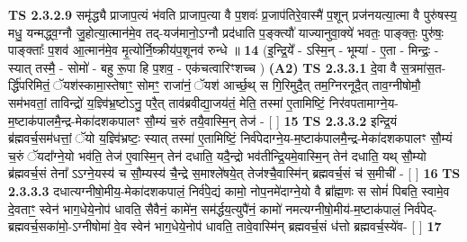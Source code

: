 \documentclass[17pt]{extarticle}
\begin{document}
                  \newline
                                \textbf{ TS 2.3.2.9} \newline
                  समृ॑द्ध्यै प्राजाप॒त्यं भ॑वति प्राजाप॒त्या वै प॒शवः॑ प्र॒जाप॑तिरे॒वास्मै॑ प॒शून् प्रज॑नयत्या॒त्मा वै पुरु॑षस्य॒ मधु॒ यन्मद्ध्व॒ग्नौ जु॒होत्या॒त्मान॑मे॒व तद्-यज॑मानो॒ऽग्नौ प्रद॑धाति प॒ङ्क्त्यौ॑ याज्यानुवा॒क्ये॑ भवतः॒ पाङ्क्तः॒ पुरु॑षः॒ पाङ्क्ताः᳚ प॒शव॑ आ॒त्मान॑मे॒व मृ॒त्योर्नि॒ष्क्रीय॑प॒शूनव॑ रुन्धे ॥ \textbf{  14} \newline
                  \newline
                      (इ॒न्द्रि॒ये᳚ - ऽस्मि॒न् - भूम्या॑ - ए॒ता - मिन्द्रः॒ - स्यात् तस्मै॒ - सोमो॑ - बहु रू॒पा हि प॒शव॒ - एक॑चत्वारिꣳशच्च )  \textbf{(A2)} \newline \newline
                                        \textbf{ TS 2.3.3.1} \newline
                  दे॒वा वै स॒त्रमा॑स॒त-र्द्धि॑परिमितं॒ ॅयश॑स्कामा॒स्तेषाꣳ॒॒ सोमꣳ॒॒ राजा॑नं॒ ॅयश॑ आर्च्छ॒थ् स गि॒रिमुदै॒त् तम॒ग्निरनूदै॒त् ताव॒ग्नीषोमौ॒ सम॑भवतां॒ ताविन्द्रो॑ य॒ज्ञ्वि॑भ्र॒ष्टोऽनु॒ परै॒त् ताव॑ब्रवीद्या॒जय॑तं॒ मेति॒ तस्मा॑ ए॒तामिष्टिं॒ निर॑वपतामाग्ने॒य-म॒ष्टाक॑पालमै॒न्द्र-मेका॑दशकपालꣳ सौ॒म्यं च॒रुं तयै॒वास्मि॒न् तेज॑ - [  ] \textbf{  15} \newline
                  \newline
                                \textbf{ TS 2.3.3.2} \newline
                  इन्द्रि॒यं ब्र॑ह्मवर्च॒सम॑धत्तां॒ ॅयो य॒ज्ञ्वि॑भ्रष्टः॒ स्यात् तस्मा॑ ए॒तामिष्टिं॒ निर्व॑पेदाग्ने॒य-म॒ष्टाक॑पालमै॒न्द्र-मेका॑दशकपालꣳ सौ॒म्यं च॒रुं ॅयदा᳚ग्ने॒यो भव॑ति॒ तेज॑ ए॒वास्मि॒न् तेन॑ दधाति॒ यदै॒न्द्रो भव॑तीन्द्रि॒यमे॒वास्मि॒न् तेन॑ दधाति॒ यथ् सौ॒म्यो ब्र॑ह्मवर्च॒सं तेना᳚ ऽऽग्ने॒यस्य॑ च सौ॒म्यस्य॑ चै॒न्द्रे स॒माश्ले॑षये॒त् तेज॑श्चै॒वास्मि॑न् ब्रह्मवर्च॒सं च॑ स॒मीची॑ - [  ] \textbf{  16} \newline
                  \newline
                                \textbf{ TS 2.3.3.3} \newline
                  दधात्यग्नीषो॒मीय॒-मेका॑दशकपालं॒ निर्व॑पे॒द्यं कामो॒ नोप॒नमे॑दाग्ने॒यो वै ब्रा᳚ह्म॒णः स सोमं॑ पिबति॒ स्वामे॒व दे॒वताꣳ॒॒ स्वेन॑ भाग॒धेये॒नोप॑ धावति॒ सैवैनं॒ कामे॑न॒ सम॑र्द्धय॒त्युपै॑नं॒ कामो॑ नमत्यग्नीषो॒मीय॑-म॒ष्टाक॑पालं॒ निर्व॑पेद्-ब्रह्मवर्च॒सका॑मो॒-ऽग्नीषोमा॑ वे॒व स्वेन॑ भाग॒धेये॒नोप॑ धावति॒ तावे॒वास्मि॑न् ब्रह्मवर्च॒सं ध॑त्तो ब्रह्मवर्च॒स्ये॑व- [  ] \textbf{  17} \newline
\end{document}
